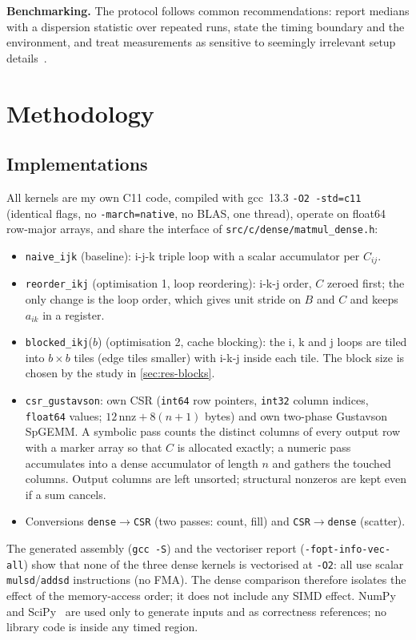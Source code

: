 \documentclass[conference,a4paper]{IEEEtran}
\begin{document}
\textbf{Benchmarking.} The protocol follows common recommendations: report medians with a dispersion
statistic over repeated runs, state the timing boundary and the environment, and treat measurements as
sensitive to seemingly irrelevant setup details~\cite{hoefler2015,mytkowicz2009}.

\section{Methodology}
\label{sec:method}

\subsection{Implementations}
\label{sec:impl}
All kernels are my own C11 code, compiled with gcc~13.3 \texttt{-O2 -std=c11} (identical flags, no
\texttt{-march=native}, no BLAS, one thread), operate on float64 row-major arrays, and share the interface
of \texttt{src/c/dense/matmul\_dense.h}:
\begin{itemize}
\item \texttt{naive\_ijk} (baseline): i-j-k triple loop with a scalar accumulator per $C_{ij}$.
\item \texttt{reorder\_ikj} (optimisation 1, loop reordering): i-k-j order, $C$ zeroed first; the only change
  is the loop order, which gives unit stride on $B$ and $C$ and keeps $a_{ik}$ in a register.
\item \texttt{blocked\_ikj}($b$) (optimisation 2, cache blocking): the i, k and j loops are tiled into
  $b\times b$ tiles (edge tiles smaller) with i-k-j inside each tile. The block size is chosen by the study
  in \cref{sec:res-blocks}.
\item \texttt{csr\_gustavson}: own CSR (\texttt{int64} row pointers, \texttt{int32} column indices,
  \texttt{float64} values; $12\,\mathrm{nnz}+8(n+1)$ bytes) and own two-phase Gustavson SpGEMM. A symbolic
  pass counts the distinct columns of every output row with a marker array so that $C$ is allocated
  exactly; a numeric pass accumulates into a dense accumulator of length $n$ and gathers the touched
  columns. Output columns are left unsorted; structural nonzeros are kept even if a sum cancels.
\item Conversions \texttt{dense$\to$CSR} (two passes: count, fill) and \texttt{CSR$\to$dense} (scatter).
\end{itemize}
The generated assembly (\texttt{gcc -S}) and the vectoriser report (\texttt{-fopt-info-vec-all}) show that
none of the three dense kernels is vectorised at \texttt{-O2}: all use scalar \texttt{mulsd}/\texttt{addsd}
instructions (no FMA). The dense comparison therefore isolates the effect of the memory-access order; it
does not include any SIMD effect.
NumPy~\cite{harris2020} and SciPy~\cite{virtanen2020} are used only to generate inputs and as correctness
references; no library code is inside any timed region.
\end{document}
